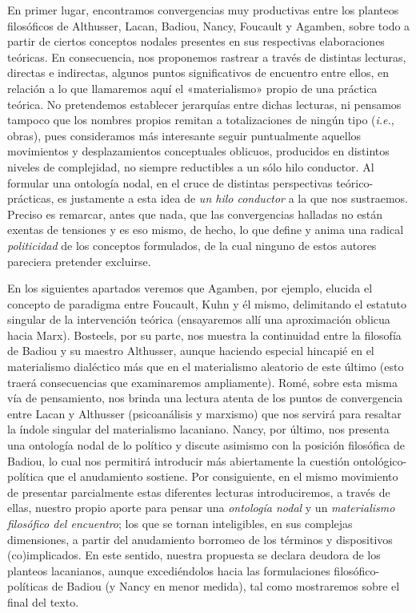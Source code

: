 En primer lugar, encontramos convergencias muy productivas entre los planteos filosóficos de Althusser, Lacan, Badiou, Nancy, Foucault y Agamben, sobre todo a partir de ciertos conceptos nodales presentes en sus respectivas elaboraciones teóricas. En consecuencia, nos proponemos rastrear a través de distintas lecturas, directas e indirectas, algunos puntos significativos de encuentro entre ellos, en relación a lo que llamaremos aquí el «materialismo» propio de una práctica teórica. No pretendemos establecer jerarquías entre dichas lecturas, ni pensamos tampoco que los nombres propios remitan a totalizaciones de ningún tipo (\emph{i.e.}, obras), pues consideramos más interesante seguir puntualmente aquellos movimientos y desplazamientos conceptuales oblicuos, producidos en distintos niveles de complejidad, no siempre reductibles a un sólo hilo conductor. Al formular una ontología nodal, en el cruce de distintas perspectivas teórico-prácticas, es justamente a esta idea de \emph{un hilo conductor} a la que nos sustraemos. Preciso es remarcar, antes que nada, que las convergencias halladas no están exentas de tensiones y es eso mismo, de hecho, lo que define y anima una radical \emph{politicidad} de los conceptos formulados, de la cual ninguno de estos autores pareciera pretender excluirse.

En los siguientes apartados veremos que Agamben, por ejemplo, elucida el concepto de paradigma entre Foucault, Kuhn y él mismo, delimitando el estatuto singular de la intervención teórica (ensayaremos allí una aproximación oblicua hacia Marx). Bosteels, por su parte, nos muestra la continuidad entre la filosofía de Badiou y su maestro Althusser, aunque haciendo especial hincapié en el materialismo dialéctico más que en el materialismo aleatorio de este último (esto traerá consecuencias que examinaremos ampliamente). Romé, sobre esta misma vía de pensamiento, nos brinda una lectura atenta de los puntos de convergencia entre Lacan y Althusser (psicoanálisis y marxismo) que nos servirá para resaltar la índole singular del materialismo lacaniano. Nancy, por último, nos presenta una ontología nodal de lo político y discute asimismo con la posición filosófica de Badiou, lo cual nos permitirá introducir más abiertamente la cuestión ontológico-política que el anudamiento sostiene. Por consiguiente, en el mismo movimiento de presentar parcialmente estas diferentes lecturas introduciremos, a través de ellas, nuestro propio aporte para pensar una \emph{ontología nodal} y un \emph{materialismo filosófico del encuentro}; los que se tornan inteligibles, en sus complejas dimensiones, a partir del anudamiento borromeo de los términos y dispositivos (co)implicados. En este sentido, nuestra propuesta se declara deudora de los planteos lacanianos, aunque excediéndolos hacia las formulaciones filosófico-políticas de Badiou (y Nancy en menor medida), tal como mostraremos sobre el final del texto.

